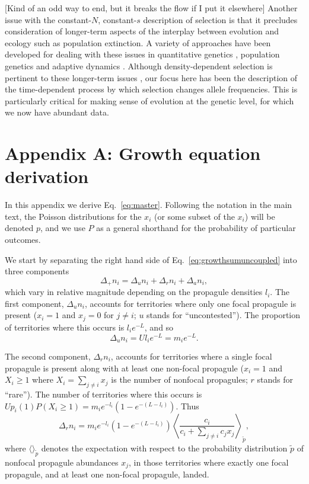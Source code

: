 \documentclass[12pt]{article}
\begin{document}
[Kind of an odd way to end, but it breaks the flow if I put it elsewhere] Another issue with the constant-$N$, constant-$s$ description of selection is that it precludes consideration of longer-term aspects of the interplay between evolution and ecology such as population extinction. A variety of approaches have been developed for dealing with these issues in quantitative genetics \citep{burger1995evolution,engen_2013}, population genetics \citep{bertram2017predicting} and adaptive dynamics \citep{ferriere2013eco,dieckmann2004adaptive}. Although density-dependent selection is  pertinent to these longer-term issues \citep{travis_2013}, our focus here has been the description of the time-dependent process by which selection changes allele frequencies. This is particularly critical for making sense of evolution at the genetic level, for which we now have abundant data.


 

\section*{Appendix A: Growth equation derivation}

In this appendix we derive Eq.~\eqref{eq:master}. Following the notation in the main text, the Poisson distributions for the $x_i$ (or some subset of the $x_i$) will be denoted $p$, and we use $P$ as a general shorthand for the probability of particular outcomes.

We start by separating the right hand side of Eq.~\eqref{eq:growthsumuncoupled} into three components
\begin{equation}
\Delta_+ n_i = \Delta_u n_i+\Delta_r n_i+\Delta_a n_i,\label{eq:delt_decomp}
\end{equation}
which vary in relative magnitude depending on the propagule densities $l_i$. The first component, $\Delta_u n_i$, accounts for territories where only one focal propagule is present ($x_i=1$ and $x_j=0$ for $j\neq i$; $u$ stands for ``uncontested''). The proportion of territories where this occurs is $l_i e^{-L}$, and so 
\begin{equation}
\Delta_u n_i=Ul_i e^{-L}=m_i e^{-L}.
\end{equation}

The second component, $\Delta_r n_i$, accounts for territories where a single focal propagule is present along with at least one non-focal propagule ($x_i=1$ and $X_i\geq 1$ where $X_i=\sum_{j\neq i} x_j$ is the number of nonfocal propagules; $r$ stands for ``rare''). The number of territories where this occurs is $Up_i(1)P(X_i\geq 1)=m_i e^{-l_i}(1-e^{-(L-l_i)})$. Thus 
\begin{equation}
\Delta_r n_i = m_i e^{-l_i}(1-e^{-(L-l_i)})\left\langle  \frac{c_i}{c_i +\sum_{j\neq i} c_j x_j } \right\rangle_{\tilde{p}},  \label{eq:deltr}
\end{equation}
where $\langle \rangle_{\tilde{p}}$ denotes the expectation with respect to the probability distribution $\tilde{p}$ of nonfocal propagule abundances $x_j$, in those territories where exactly one focal propagule, and at least one non-focal propagule, landed. 
\end{document}
